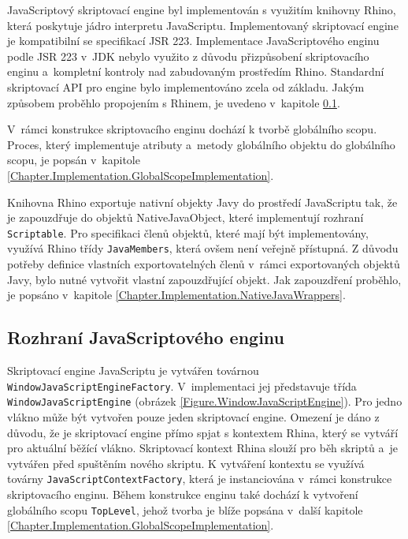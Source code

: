 JavaScriptový skriptovací engine byl implementován s využitím knihovny Rhino, která poskytuje jádro interpretu JavaScriptu. Implementovaný skriptovací engine je kompatibilní se specifikací JSR 223. Implementace JavaScriptového enginu podle JSR 223 v~JDK nebylo využito z důvodu přizpůsobení skriptovacího enginu a~kompletní kontroly nad zabudovaným prostředím Rhino. Standardní skriptovací API pro engine bylo implementováno zcela od základu. Jakým způsobem proběhlo propojením s Rhinem, je uvedeno v~kapitole \ref{Chapter.Implementation.JavaScriptEngineInterface}.

V~rámci konstrukce skriptovacího enginu dochází k tvorbě globálního scopu. Proces, který implementuje atributy a~metody globálního objektu do globálního scopu, je popsán v~kapitole \ref{Chapter.Implementation.GlobalScopeImplementation}. 

Knihovna Rhino exportuje nativní objekty Javy do prostředí JavaScriptu tak, že je zapouzdřuje do objektů NativeJavaObject, které implementují rozhraní \texttt{Scriptable}. Pro specifikaci členů objektů, které mají být implementovány, využívá Rhino třídy \texttt{JavaMembers}, která ovšem není veřejně přístupná. Z důvodu potřeby definice vlastních exportovatelných členů v~rámci exportovaných objektů Javy, bylo nutné vytvořit vlastní zapouzdřující objekt. Jak zapouzdření proběhlo, je popsáno v~kapitole \ref{Chapter.Implementation.NativeJavaWrappers}.

\subsection{Rozhraní JavaScriptového enginu}
\label{Chapter.Implementation.JavaScriptEngineInterface}

Skriptovací engine JavaScriptu je vytvářen továrnou \texttt{WindowJavaScriptEngineFactory}. V~implementaci jej představuje třída \texttt{WindowJavaScriptEngine} (obrázek \ref{Figure.WindowJavaScriptEngine}). Pro jedno vlákno může být vytvořen pouze jeden skriptovací engine. Omezení je dáno z důvodu, že je skriptovací engine přímo spjat s kontextem Rhina, který se vytváří pro aktuální běžící vlákno. Skriptovací kontext Rhina slouží pro běh skriptů a~je vytvářen před spuštěním nového skriptu. K vytváření kontextu se využívá továrny \texttt{JavaScriptContextFactory}, která je instanciována v~rámci konstrukce skriptovacího enginu. Během konstrukce enginu také dochází k vytvoření globálního scopu \texttt{TopLevel}, jehož tvorba je blíže popsána v~další kapitole \ref{Chapter.Implementation.GlobalScopeImplementation}.

